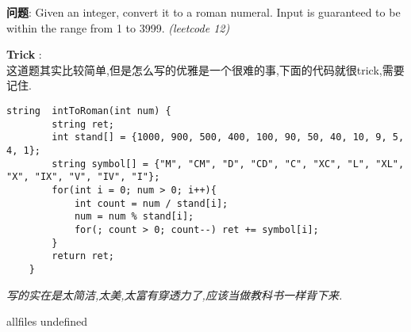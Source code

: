 \documentclass{article}
\begin{document}
\begin{CJK}{UTF8}{gbsn}     %

\else
    
\begin{description}
    \item{\textbf{问题}}: Given an integer, convert it to a roman numeral. Input is guaranteed to be within the range from 1 to 3999. \textit{(leetcode 12)}
    \item{\textbf{Trick}} : 
    \\这道题其实比较简单,但是怎么写的优雅是一个很难的事,下面的代码就很trick,需要记住.
    \begin{lstlisting}
string 	intToRoman(int num) {
		string ret;
		int stand[] = {1000, 900, 500, 400, 100, 90, 50, 40, 10, 9, 5, 4, 1};
		string symbol[] = {"M", "CM", "D", "CD", "C", "XC", "L", "XL", "X", "IX", "V", "IV", "I"};
		for(int i = 0; num > 0; i++){
			int count = num / stand[i];
			num = num % stand[i];
			for(; count > 0; count--) ret += symbol[i];
		}
		return ret;
	}
    \end{lstlisting}
    \textit{写的实在是太简洁,太美,太富有穿透力了,应该当做教科书一样背下来.}
\end{description}

\fi

\ifx allfiles undefined
\end{CJK}
\end{document}
